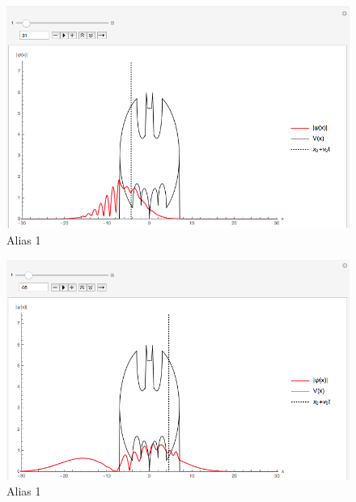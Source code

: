 \documentclass[titlepage]{article}
\begin{document}
\begin{figure}[ht]
\centering
\includegraphics[scale=0.5,center]{images/batmanbig2.png}
\caption{Alias 1}
\label{fig:2d}
\end{figure}
\FloatBarrier

\begin{figure}[ht]
\centering
\includegraphics[scale=0.5,center]{images/batmanbig3.png}
\caption{Alias 1}
\label{fig:2d}
\end{figure}
\FloatBarrier
\end{document}
